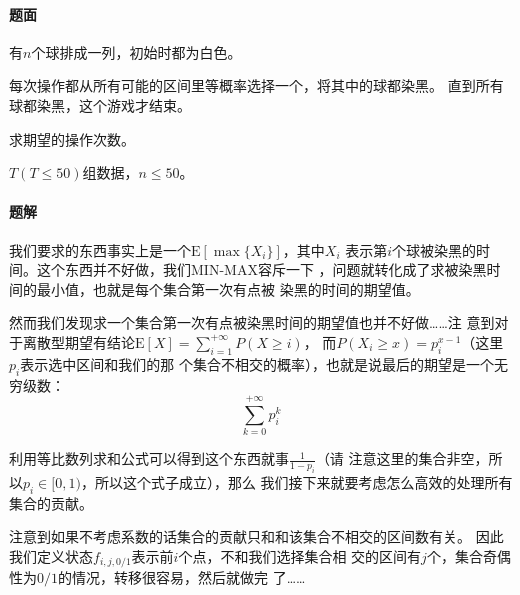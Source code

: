 \paragraph{题面}
有$n$个球排成一列，初始时都为白色。\par
每次操作都从所有可能的区间里等概率选择一个，将其中的球都染黑。
直到所有球都染黑，这个游戏才结束。\par
求期望的操作次数。\par
\(T(T\le 50)\)组数据，\(n\le 50\)。
\paragraph{题解}
我们要求的东西事实上是一个$\mathrm{E}[\max\{X_i\}]$，其中$X_i$
表示第$i$个球被染黑的时间。这个东西并不好做，我们MIN-MAX容斥一下
，问题就转化成了求被染黑时间的最小值，也就是每个集合第一次有点被
染黑的时间的期望值。\par
然而我们发现求一个集合第一次有点被染黑时间的期望值也并不好做……注
意到对于离散型期望有结论$\mathrm{E}[X]=\sum_{i = 1}^{+\infty}P(X\geq i)$，
而$P(X_i\geq x) = p_i^{x - 1}$（这里$p_i$表示选中区间和我们的那
个集合不相交的概率），也就是说最后的期望是一个无穷级数：
\[\sum_{k = 0}^{+\infty} p_i^k\]\par
利用等比数列求和公式可以得到这个东西就事$\frac{1}{1 - p_i}$（请
注意这里的集合非空，所以$p_i\in [0,1)$，所以这个式子成立），那么
我们接下来就要考虑怎么高效的处理所有集合的贡献。\par
注意到如果不考虑系数的话集合的贡献只和和该集合不相交的区间数有关。
因此我们定义状态$f_{i, j, 0/1}$表示前$i$个点，不和我们选择集合相
交的区间有$j$个，集合奇偶性为$0/1$的情况，转移很容易，然后就做完
了……